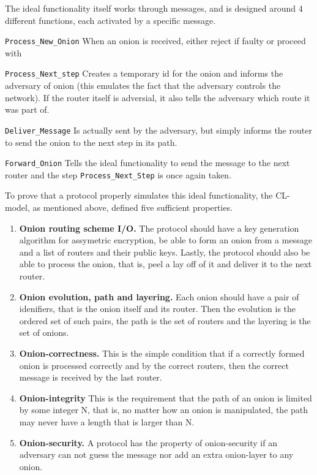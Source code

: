 The ideal functionality itself works through messages, and is
designed around 4 different functions, each activated by a specific
message.
\begin{Itemize}
  \item{{\tt Process_New_Onion} When an onion is received, either
    reject if faulty or proceed with}
  \item{{\tt Process_Next_step} Creates a temporary id for the onion
    and informs the adversary of onion (this emulates the fact that
    the adversary controls the network). If the router itself is
    adversial, it also tells the adversary which route it was part
    of. }
  \item{{\tt Deliver_Message} Is actually sent by the adversary, but
    simply informs the router to send the onion to the next step in
    its path.}
  \item{{\tt Forward_Onion} Tells the ideal functionality to send the
    message to the next router and the step {\tt Process_Next_Step} is
    once again taken.}
\end{Itemize}

To prove that a protocol properly simulates this ideal functionality,
the CL-model, as mentioned above, defined five sufficient properties.

\begin{enumerate}
  \item{{\bf Onion routing scheme I/O.} The protocol should have a key
  generation algorithm for assymetric encryption, be able to form an
  onion from a message and a list of routers and their public
  keys. Lastly, the protocol should also be able to process the onion,
  that is, peel a lay off of it and deliver it to the next router.}

  \item{{\bf Onion evolution, path and layering.} Each onion should
    have a pair of idenifiers, that is the onion itself and its
    router. Then the evolution is the ordered set of such pairs, the path is
    the set of routers and the layering is the set of onions.}

  \item{{\bf Onion-correctness.} This is the simple condition that if a
  correctly formed onion is processed correctly and by the correct
  routers, then the correct message is received by the last router.}

  \item{{\bf Onion-integrity} This is the requirement that the path of
  an onion is limited by some integer N, that is, no matter how an
  onion is manipulated, the path may never have a length that is
  larger than N.}

  \item{{\bf Onion-security.} A protocol has the property of
    onion-security if an adversary can not guess the message nor add
    an extra onion-layer to any onion.}
  
\end{enumerate}


